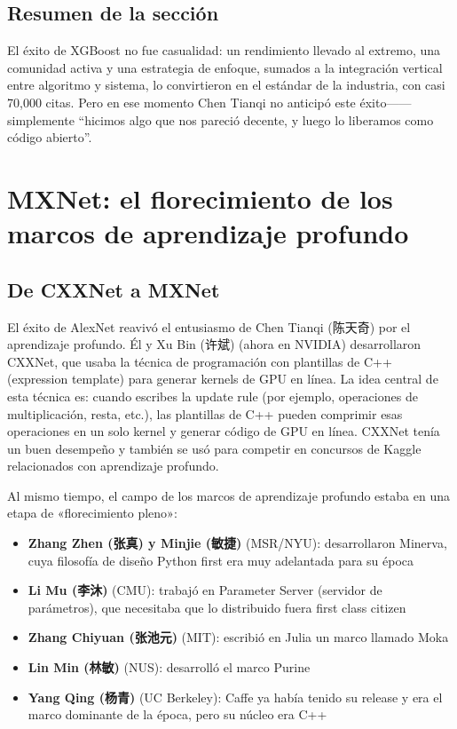 \documentclass[a4paper]{article}
\begin{document}
\subsection{Resumen de la sección}

El éxito de XGBoost no fue casualidad: un rendimiento llevado al extremo, una comunidad activa y una estrategia de enfoque, sumados a la integración vertical entre algoritmo y sistema, lo convirtieron en el estándar de la industria, con casi 70,000 citas. Pero en ese momento Chen Tianqi no anticipó este éxito------simplemente ``hicimos algo que nos pareció decente, y luego lo liberamos como código abierto''.
\section{MXNet: el florecimiento de los marcos de aprendizaje profundo}

\subsection{De CXXNet a MXNet}

El éxito de AlexNet reavivó el entusiasmo de Chen Tianqi (陈天奇) por el aprendizaje profundo. Él y Xu Bin (许斌) (ahora en NVIDIA) desarrollaron CXXNet, que usaba la técnica de programación con plantillas de C++ (expression template) para generar kernels de GPU en línea. La idea central de esta técnica es: cuando escribes la update rule (por ejemplo, operaciones de multiplicación, resta, etc.), las plantillas de C++ pueden comprimir esas operaciones en un solo kernel y generar código de GPU en línea. CXXNet tenía un buen desempeño y también se usó para competir en concursos de Kaggle relacionados con aprendizaje profundo.

Al mismo tiempo, el campo de los marcos de aprendizaje profundo estaba en una etapa de «florecimiento pleno»:

\begin{itemize}
    \item \textbf{Zhang Zhen (张真) y Minjie (敏捷)} (MSR/NYU): desarrollaron Minerva, cuya filosofía de diseño Python first era muy adelantada para su época
    \item \textbf{Li Mu (李沐)} (CMU): trabajó en Parameter Server (servidor de parámetros), que necesitaba que lo distribuido fuera first class citizen
    \item \textbf{Zhang Chiyuan (张池元)} (MIT): escribió en Julia un marco llamado Moka
    \item \textbf{Lin Min (林敏)} (NUS): desarrolló el marco Purine
    \item \textbf{Yang Qing (杨青)} (UC Berkeley): Caffe ya había tenido su release y era el marco dominante de la época, pero su núcleo era C++
\end{itemize}
\end{document}
